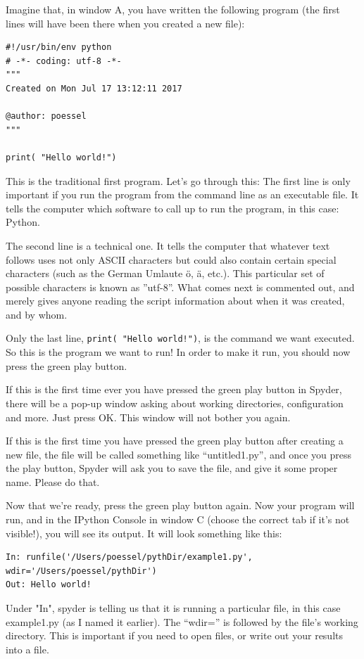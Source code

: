 \documentclass[twocolumn,apj]{openjournal}
\begin{document}
Imagine that, in window A, you have written the following program (the first lines will have been there when you created a new file):
\begin{lstlisting}
#!/usr/bin/env python
# -*- coding: utf-8 -*-
"""
Created on Mon Jul 17 13:12:11 2017

@author: poessel
"""

print( "Hello world!")
\end{lstlisting}
This is the traditional first program. Let's go through this: The first line is only important if you run the program from the command line as an executable file. It tells the computer which software to call up to run the program, in this case: Python. 

The second line is a technical one. It tells the computer that whatever text follows uses not only ASCII characters but could also contain certain special characters (such as the German Umlaute \"o, \"a, etc.). This particular set of possible characters is known as ''utf-8''. What comes next is commented out, and merely gives anyone reading the script information about when it was created, and by whom.

Only the last line, \verb|print( "Hello world!")|, is the command we want executed. So this is the program we want to run! In order to make it run, you should now press the green play button. 

If this is the first time ever you have pressed the green play button in Spyder, there will be a pop-up window asking about working directories, configuration and more. Just press OK. This window will not bother you again. 

If this is the first time you have pressed the green play button after creating a new file, the file will be called something like ``untitled1.py'', and once you press the play button, Spyder will ask you to save the file, and give it some proper name. Please do that.

Now that we're ready, press the green play button again. Now your program will run, and in the IPython Console in window C (choose the correct tab if it's not visible!), you will see its output. It will look something like this:
\begin{lstlisting}
In: runfile('/Users/poessel/pythDir/example1.py', wdir='/Users/poessel/pythDir')
Out: Hello world!
\end{lstlisting}
Under "In", spyder is telling us that it is running a particular file, in this case example1.py (as I named it earlier). The ``wdir='' is followed by the file's working directory. This is important if you need to open files, or write out your results into a file. 
\end{document}
